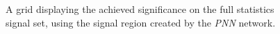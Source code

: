 \begin{figure}
    \caption{A grid displaying the achieved significance on the full statistics signal set, using the signal region 
    created by the \emph{PNN} network.}
    \label{fig:FSComp}
\end{figure}